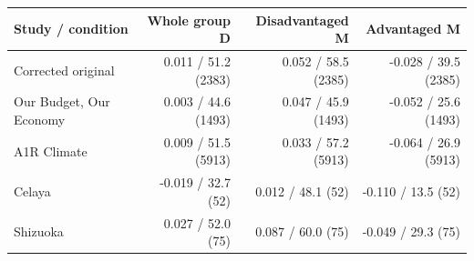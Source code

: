 
\begin{tabular}{lrrr}
\toprule
Study / condition & Whole group D & Disadvantaged M & Advantaged M\\
\midrule
Corrected original & 0.011 / 51.2 (2383) & 0.052 / 58.5 (2385) & -0.028 / 39.5 (2385)\\
Our Budget, Our Economy & 0.003 / 44.6 (1493) & 0.047 / 45.9 (1493) & -0.052 / 25.6 (1493)\\
A1R Climate & 0.009 / 51.5 (5913) & 0.033 / 57.2 (5913) & -0.064 / 26.9 (5913)\\
Celaya & -0.019 / 32.7 (52) & 0.012 / 48.1 (52) & -0.110 / 13.5 (52)\\
Shizuoka & 0.027 / 52.0 (75) & 0.087 / 60.0 (75) & -0.049 / 29.3 (75)\\
\bottomrule
\end{tabular}
